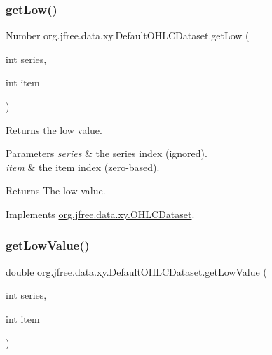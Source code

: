 \mbox{\label{classorg_1_1jfree_1_1data_1_1xy_1_1_default_o_h_l_c_dataset_a6613a90e1ad1a6ecfdee32baa3097a14}} 
\subsubsection{\texorpdfstring{get\+Low()}{getLow()}}
{\footnotesize\ttfamily Number org.\+jfree.\+data.\+xy.\+Default\+O\+H\+L\+C\+Dataset.\+get\+Low (\begin{DoxyParamCaption}\item[{int}]{series,  }\item[{int}]{item }\end{DoxyParamCaption})}

Returns the low value.


\begin{DoxyParams}{Parameters}
{\em series} & the series index (ignored). \\
\hline
{\em item} & the item index (zero-\/based).\\
\hline
\end{DoxyParams}
\begin{DoxyReturn}{Returns}
The low value. 
\end{DoxyReturn}


Implements \mbox{\hyperlink{interfaceorg_1_1jfree_1_1data_1_1xy_1_1_o_h_l_c_dataset_a87d7730829e66f23a2601c3519cf828a}{org.\+jfree.\+data.\+xy.\+O\+H\+L\+C\+Dataset}}.

\mbox{\label{classorg_1_1jfree_1_1data_1_1xy_1_1_default_o_h_l_c_dataset_a507dcc283d6624b8da7d12c4352dcd0d}} 
\subsubsection{\texorpdfstring{get\+Low\+Value()}{getLowValue()}}
{\footnotesize\ttfamily double org.\+jfree.\+data.\+xy.\+Default\+O\+H\+L\+C\+Dataset.\+get\+Low\+Value (\begin{DoxyParamCaption}\item[{int}]{series,  }\item[{int}]{item }\end{DoxyParamCaption})}

